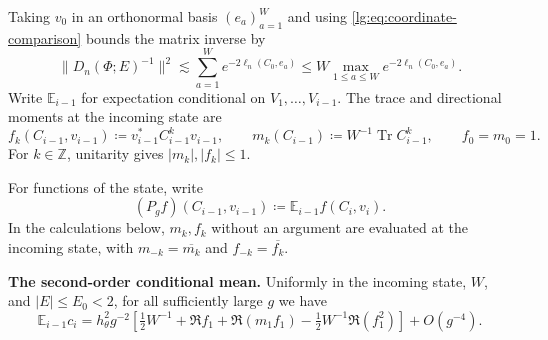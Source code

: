 \documentclass[11pt]{article}
\numberwithin{equation}{section}
\theoremstyle{remark}
\newcommand{\E}{\mathbb E}
\newcommand{\Tr}{\operatorname{Tr}}
\begin{document}
Taking $v_0$ in an orthonormal basis $(e_a)_{a=1}^W$ and using
\eqref{lg:eq:coordinate-comparison} bounds the matrix inverse by
\begin{equation}\label{lg:eq:scalar-reduction}
 \|D_n(\Phi;E)^{-1}\|^2
 \lesssim \sum_{a=1}^W e^{-2\ell_n(C_0,e_a)}
 \le W\max_{1\le a\le W} e^{-2\ell_n(C_0,e_a)} .
\end{equation}
Write $\E_{i-1}$ for expectation conditional on $V_1,\ldots,V_{i-1}$.
The trace and directional moments at the incoming state are
\begin{equation}\label{lg:eq:observables}
 f_k(C_{i-1},v_{i-1})\coloneqq v_{i-1}^*C_{i-1}^kv_{i-1},\qquad
 m_k(C_{i-1})\coloneqq W^{-1}\Tr C_{i-1}^k,\qquad f_0=m_0=1.
\end{equation}
For $k\in\mathbb Z$, unitarity gives $|m_k|,|f_k|\le1$.

For functions of the state, write
\begin{equation}\label{lg:eq:transition}
 (P_gf)(C_{i-1},v_{i-1})\coloneqq\E_{i-1}f(C_i,v_i).
\end{equation}
In the calculations below, $m_k,f_k$ without an argument are
evaluated at the incoming state, with
$m_{-k}=\overline{m_k}$ and $f_{-k}=\overline{f_k}$.

\noindent\textbf{The second-order conditional mean.}
Uniformly in the incoming state, $W$, and $|E|\le E_0<2$, for all
sufficiently large $g$ we have
\begin{equation}\label{lg:eq:c2}
 \E_{i-1}c_i=h_\theta^2g^{-2}\left[\tfrac12 W^{-1}+\Re f_1+\Re(m_1f_1)
                         -\tfrac12 W^{-1}\Re(f_1^2)\right]+O(g^{-4}).
\end{equation}
\end{document}
